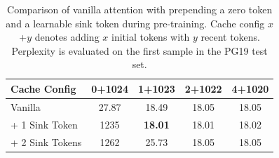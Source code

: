 \begin{table}
    \centering
    \setlength{\tabcolsep}{3pt}
    \small
    \caption{Comparison of vanilla attention with prepending a zero token and a learnable sink token during pre-training. Cache config $x$+$y$ denotes adding $x$ initial tokens with $y$ recent tokens. Perplexity is evaluated on the first sample in the PG19 test set.}
    \label{tab:pretrain_fix2}
    \begin{tabular}{lcccc}
        \toprule
        Cache Config    & 0+1024 & 1+1023         & 2+1022 & 4+1020 \\
        \midrule
        Vanilla         & 27.87  & 18.49          & 18.05  & 18.05  \\
        + 1 Sink Token  & 1235   & \textbf{18.01} & 18.01  & 18.02  \\
        + 2 Sink Tokens & 1262   & 25.73          & 18.05  & 18.05  \\
        \bottomrule
    \end{tabular}
\end{table}
